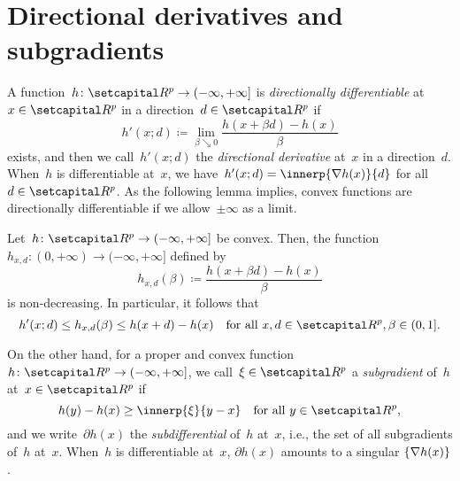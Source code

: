 \documentclass[../main]{subfiles}
\begin{document}
\section{Directional derivatives and subgradients}
A function~$h \colon \setR^p \to (-\infty, +\infty]$ is \emph{directionally differentiable} at~$x \in \setR^p$ in a direction~$d \in \setR^p$ if
\begin{equation} \label{eq:dir_deriv}
    h'(x; d) \coloneqq \lim_{\beta \searrow 0} \frac{h(x + \beta d) - h(x)}{\beta}
\end{equation}
exists, and then we call~$h'(x; d)$ the \emph{directional derivative} at~$x$ in a direction~$d$.
When~$h$ is differentiable at~$x$, we have~$h'(x; d) = \innerp{\nabla h(x)}{d}$ for all~$d \in \setR^p$.
As the following lemma implies, convex functions are directionally differentiable if we allow~$\pm \infty$ as a limit.
\begin{lemma} 
    Let~$h \colon \setR^p \to (-\infty, +\infty]$ be convex.
    Then, the function~$h_{x, d} \colon (0, +\infty) \to (-\infty, +\infty]$ defined by
    \begin{equation}
        h_{x, d}(\beta) \coloneqq \frac{h(x + \beta d) - h(x)}{\beta}
    \end{equation}
    is non-decreasing.
    In particular, it follows that
    \begin{equation}
        h'(x; d) \le h_{x, d}(\beta) \le h(x + d) - h(x) \forallcondition{x, d \in \setR^p, \beta \in (0, 1]}
        .\end{equation}
\end{lemma}
On the other hand, for a proper and convex function~$h \colon \setR^p \to (-\infty, +\infty]$, we call~$\xi \in \setR^p$ a \emph{subgradient} of~$h$ at~$x \in \setR^p$ if
\begin{equation} \label{eq:subgrad}
    h(y) - h(x) \ge \innerp{\xi}{y - x} \forallcondition{y \in \setR^p}
    ,\end{equation}
and we write~$\partial h(x)$ the \emph{subdifferential} of~$h$ at~$x$, i.e., the set of all subgradients of~$h$ at~$x$.
When~$h$ is differentiable at~$x$, $\partial h(x)$ amounts to a singular $\lbrace\nabla h(x)\rbrace$.
\end{document}
